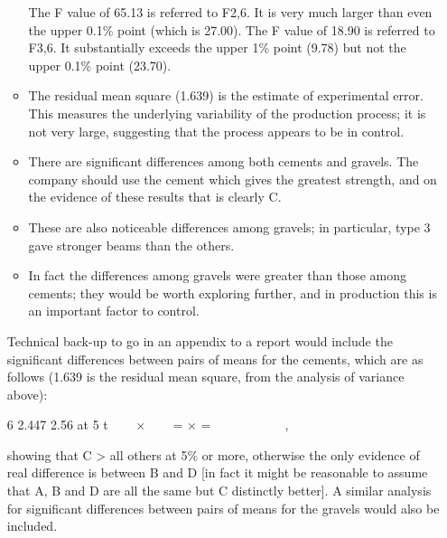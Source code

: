 \documentclass[a4paper,12pt]{article}
\begin{document}
\begin{enumerate}
\begin{itemize}
\ite The F value of 65.13 is referred to F2,6.  It is very much larger than even the upper 0.1\% point (which is 27.00).  The F value of 18.90 is referred to F3,6.  It substantially exceeds the upper 1\% point (9.78) but not the upper 0.1\% point (23.70). 
 
\item The residual mean square (1.639) is the estimate of experimental error.  This measures the underlying variability of the production process;  it is not very large, suggesting that the process appears to be in control. 
 
\item There are significant differences among both cements and gravels.  The company should use the cement which gives the greatest strength, and on the evidence of these results that is clearly C.  
\item These are also noticeable differences among gravels;  in particular, type 3 gave stronger beams than the others.  
\item In fact the differences among gravels were greater than those among cements;  they would be worth exploring further, and in production this is an important factor to control. 
\end{itemize}  
 
Technical back-up to go in an appendix to a report would include the significant differences between pairs of means for the cements, which are as follows (1.639 is the residual mean square, from the analysis of variance above): 
 
6
2.447 2.56 at 5%
t
   ×    = × =         
  , 
 
showing that C > all others at 5\% or more, otherwise the only evidence of real difference is between B and D [in fact it might be reasonable to assume that A, B and D are all the same but C distinctly better].  A similar analysis for significant differences between pairs of means for the gravels would also be included. 

\end{enumerate}
\end{document}
